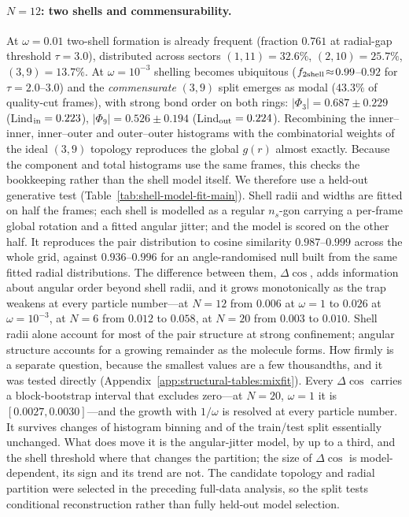 \paragraph{$N{=}12$: two shells and commensurability.}
At $\omega=0.01$ two-shell formation is already frequent (fraction $0.761$ at
radial-gap threshold $\tau{=}3.0$), distributed across sectors
$(1,11)=32.6\%$, $(2,10)=25.7\%$, $(3,9)=13.7\%$.
At $\omega=10^{-3}$ shelling becomes ubiquitous
($f_{\rm 2shell}\!\approx\!0.99$--$0.92$ for $\tau=2.0$--$3.0$) and the
\emph{commensurate} $(3,9)$ split emerges as modal ($43.3\%$ of quality-cut
frames), with strong bond order on both rings:
$|\Phi_3|=0.687\pm0.229$ (Lind$_{\rm in}=0.223$),
$|\Phi_9|=0.526\pm0.194$ (Lind$_{\rm out}=0.224$).
Recombining the inner--inner, inner--outer and outer--outer histograms with the combinatorial
weights of the ideal $(3,9)$ topology reproduces the global $g(r)$ almost exactly. Because
the component and total histograms use the same frames, this checks the bookkeeping rather
than the shell model itself. We therefore use a held-out generative test
(Table~\ref{tab:shell-model-fit-main}).
Shell radii and widths are fitted on half the frames; each shell is modelled as a regular
$n_s$-gon carrying a per-frame global rotation and a fitted angular jitter; and the model is
scored on the other half. It reproduces the pair distribution to cosine similarity
$0.987$--$0.999$ across the whole grid, against $0.936$--$0.996$ for an angle-randomised
null built from the same fitted radial distributions. The difference between them,
$\Delta\cos$, adds information about angular order beyond shell radii, and it grows
monotonically as the trap weakens at every particle number---at $N{=}12$ from $0.006$ at $\omega=1$ to $0.026$ at $\omega=10^{-3}$, at $N{=}6$ from
$0.012$ to $0.058$, at $N{=}20$ from $0.003$ to $0.010$. Shell radii alone account for most
of the pair structure at strong confinement; angular structure accounts for a growing
remainder as the molecule forms. How firmly is a separate question, because the smallest
values are a few thousandths, and it was tested directly
(Appendix~\ref{app:structural-tables:mixfit}). Every $\Delta\cos$ carries a block-bootstrap
interval that excludes zero---at $N{=}20$, $\omega=1$ it is $[0.0027,0.0030]$---and the
growth with $1/\omega$ is resolved at every particle number. It survives changes of histogram
binning and of the train/test split essentially unchanged. What does move it is the
angular-jitter model, by up to a third, and the shell threshold where that changes the
partition; the size of $\Delta\cos$ is model-dependent, its sign and its trend are not. The
candidate topology and radial partition were selected in the preceding full-data analysis,
so the split tests conditional reconstruction rather than fully held-out model selection.

